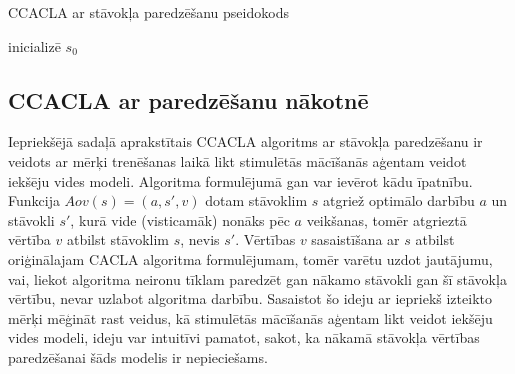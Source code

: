 \documentclass{ludis} %
\begin{document}
\begin{spacing}{1}
\begin{algorithm}
\caption{CCACLA ar stāvokļa paredzēšanu pseidokods}\label{alg:ccacla-state}
inicializē $s_0$ \\
\end{algorithm}
\end{spacing}

\subsection{CCACLA ar paredzēšanu nākotnē}
Iepriekšējā sadaļā aprakstītais CCACLA algoritms ar stāvokļa paredzēšanu ir
veidots ar mērķi trenēšanas laikā likt stimulētās mācīšanās aģentam veidot
iekšēju vides modeli. Algoritma formulējumā gan var ievērot kādu īpatnību.
Funkcija $Aov(s) = (a, s', v)$ dotam stāvoklim $s$ atgriež optimālo darbību $a$
un stāvokli $s'$, kurā vide (visticamāk) nonāks pēc $a$ veikšanas, tomēr
atgrieztā vērtība $v$ atbilst stāvoklim $s$, nevis $s'$. Vērtības $v$
sasaistīšana ar $s$ atbilst oriģinālajam CACLA algoritma formulējumam, tomēr
varētu uzdot jautājumu, vai, liekot algoritma neironu tīklam paredzēt gan nākamo
stāvokli gan šī stāvokļa vērtību, nevar uzlabot algoritma darbību. Sasaistot šo
ideju ar iepriekš izteikto mērķi mēģināt rast veidus, kā stimulētās mācīšanās
aģentam likt veidot iekšēju vides modeli, ideju var intuitīvi pamatot, sakot, ka
nākamā stāvokļa vērtības paredzēšanai šāds modelis ir nepieciešams.
\end{document}
